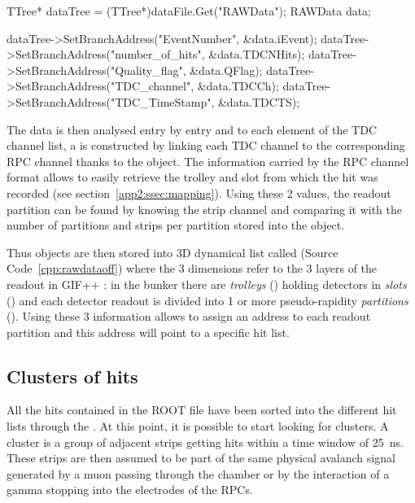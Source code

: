 	\begin{code}
    \begin{cppcode}
TTree*  dataTree = (TTree*)dataFile.Get("RAWData");
RAWData data;

dataTree->SetBranchAddress("EventNumber",    &data.iEvent);
dataTree->SetBranchAddress("number_of_hits", &data.TDCNHits);
dataTree->SetBranchAddress("Quality_flag",   &data.QFlag);
dataTree->SetBranchAddress("TDC_channel",    &data.TDCCh);
dataTree->SetBranchAddress("TDC_TimeStamp",  &data.TDCTS);
    \end{cppcode}
	\label{cpp:rawdatalink}
	\vspace{5mm}
    \end{code}
    
    The data is then analysed entry by entry and to each element of the TDC channel list, a  is constructed by linking each TDC channel to the corresponding RPC channel thanks to the  object. The information carried by the RPC channel format allows to easily retrieve the trolley and slot from which the hit was recorded (see section~\ref{app2:ssec:mapping}). Using these 2 values, the readout partition can be found by knowing the strip channel and comparing it with the number of partitions and strips per partition stored into the  object.
    
    Thus  objects are then stored into 3D dynamical list called  (Source Code~\ref{cpp:rawdataoff}) where the 3 dimensions refer to the 3 layers of the readout in GIF++ : in the bunker there are \textit{trolleys} () holding detectors in \textit{slots} () and each detector readout is divided into 1 or more pseudo-rapidity \textit{partitions} (). Using these 3 information allows to assign an address to each readout partition and this address will point to a specific hit list.\\
	
	\subsection{Clusters of hits}
	\label{app2:ssec:RPCCluster}
	
	All the hits contained in the ROOT file have been sorted into the different hit lists through the . At this point, it is possible to start looking for clusters. A cluster is a group of adjacent strips getting hits within a time window of \SI{25}{ns}. These strips are then assumed to be part of the same physical avalanch signal generated by a muon passing through the chamber or by the interaction of a gamma stopping into the electrodes of the RPCs.
	
